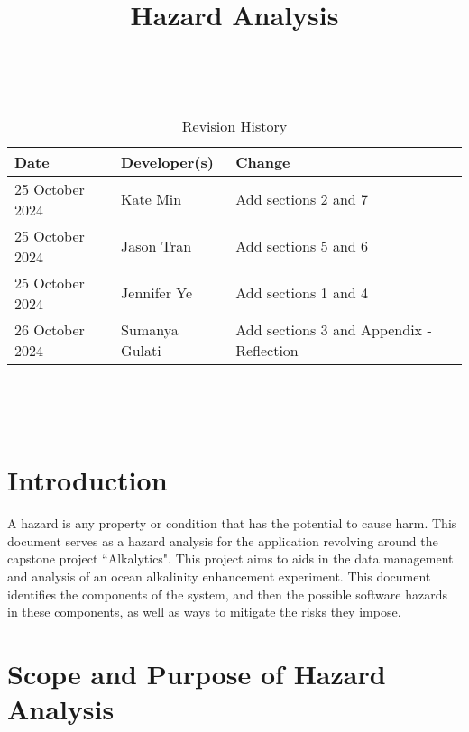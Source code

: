 \documentclass{article}
\title{Hazard Analysis\\\progname}
\author{\authname}
\date{}
\begin{document}
\maketitle
\thispagestyle{empty}

~\newpage


\begin{table}[hp]
\caption{Revision History} \label{TblRevisionHistory}
\begin{tabularx}{\textwidth}{llX}
\toprule
\textbf{Date} & \textbf{Developer(s)} & \textbf{Change}\\
\midrule
25 October 2024 & Kate Min & Add sections 2 and 7\\
25 October 2024 & Jason Tran & Add sections 5 and 6\\
25 October 2024 & Jennifer Ye & Add sections 1 and 4\\
26 October 2024 & Sumanya Gulati & Add sections 3 and Appendix - Reflection\\
\bottomrule
\end{tabularx}
\end{table}

~\newpage

\tableofcontents

~\newpage


\section{Introduction}

A hazard is any property or condition that has the potential to cause harm. This
document serves as a hazard analysis for the application revolving around the
capstone project ``Alkalytics". This project aims to aids in the data management
and analysis of an ocean alkalinity enhancement experiment. This document
identifies the components of the system, and then the possible software hazards
in these components, as well as ways to mitigate the risks they impose.

\section{Scope and Purpose of Hazard Analysis}
\end{document}
